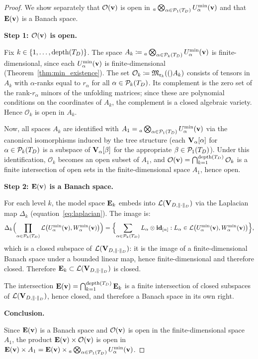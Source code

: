 \begin{proof}
We show separately that $\mathcal{O}(\mathbf{v})$ is open in
${}_a\bigotimes_{\alpha \in \mathcal{P}_{1}(T_D)} U^{\min}_{\alpha}(\mathbf{v})$
and that $\mathbf{E}(\mathbf{v})$ is a Banach space.

\medskip
\noindent\textbf{Step 1: $\mathcal{O}(\mathbf{v})$ is open.}

Fix $k \in \{1, \ldots, \mathrm{depth}(T_D)\}$. The space
$A_k \coloneqq {}_a\bigotimes_{\alpha \in \mathcal{P}_{k}(T_D)} U^{\min}_{\alpha}(\mathbf{v})$
is finite-dimensional, since each $U^{\min}_{\alpha}(\mathbf{v})$ is
finite-dimensional (Theorem~\ref{thm:min_existence}).
The set $\mathcal{O}_k \coloneqq \mathfrak{M}_{\mathfrak{r}_k}(()A_k)$ consists of
tensors in $A_k$ with $\alpha$-ranks equal to $r_\alpha$ for all
$\alpha \in \mathcal{P}_{k}(T_D)$. Its complement is the zero set of the
rank-$r_\alpha$ minors of the unfolding matrices; since these are
polynomial conditions on the coordinates of $A_k$, the complement is
a closed algebraic variety. Hence $\mathcal{O}_k$ is open in $A_k$.

Now, all spaces $A_k$ are identified with
$A_1 = {}_a\bigotimes_{\alpha \in \mathcal{P}_{1}(T_D)} U^{\min}_{\alpha}(\mathbf{v})$
via the canonical isomorphisms induced by the tree structure (each
$\mathbf{V}_\alpha[\alpha]$ for $\alpha \in \mathcal{P}_{k}(T_D)$ is a subspace of
$\mathbf{V}_\alpha[\beta]$ for the appropriate $\beta \in \mathcal{P}_{1}(T_D)$).
Under this identification, $\mathcal{O}_k$ becomes an open subset of
$A_1$, and $\mathcal{O}(\mathbf{v}) = \bigcap_{k=1}^{\mathrm{depth}(T_D)} \mathcal{O}_k$
is a finite intersection of open sets in the finite-dimensional space
$A_1$, hence open.

\medskip
\noindent\textbf{Step 2: $\mathbf{E}(\mathbf{v})$ is a Banach space.}

For each level $k$, the model space $\mathbf{E}_{k}$ embeds into
$\mathcal{L}(\mathbf{V}_{D,\|\cdot\|_D})$ via the Laplacian map $\Delta_k$
(equation~\eqref{eq:laplacian}). The image is:
\begin{equation*}
    \Delta_k\Bigl(\prod_{\alpha \in \mathcal{P}_{k}(T_D)}
    \mathcal{L}\bigl(U^{\min}_{\alpha}(\mathbf{v}), W^{\min}_{\alpha}(\mathbf{v})\bigr)\Bigr)
    = \Bigl\{\sum_{\alpha \in \mathcal{P}_{k}(T_D)}
      L_\alpha \otimes \mathbf{id}_{[\alpha]} :
      L_\alpha \in \mathcal{L}\bigl(U^{\min}_{\alpha}(\mathbf{v}),
      W^{\min}_{\alpha}(\mathbf{v})\bigr)\Bigr\},
\end{equation*}
which is a closed subspace of $\mathcal{L}(\mathbf{V}_{D,\|\cdot\|_D})$: it is the image of a
finite-dimensional Banach space under a bounded linear map, hence
finite-dimensional and therefore closed. Therefore $\mathbf{E}_{k}
\subset \mathcal{L}(\mathbf{V}_{D,\|\cdot\|_D})$ is closed.

The intersection $\mathbf{E}(\mathbf{v}) = \bigcap_{k=1}^{\mathrm{depth}(T_D)} \mathbf{E}_{k}$
is a finite intersection of closed subspaces of $\mathcal{L}(\mathbf{V}_{D,\|\cdot\|_D})$, hence
closed, and therefore a Banach space in its own right.

\medskip
\noindent\textbf{Conclusion.}

Since $\mathbf{E}(\mathbf{v})$ is a Banach space and $\mathcal{O}(\mathbf{v})$ is
open in the finite-dimensional space $A_1$, the product
$\mathbf{E}(\mathbf{v}) \times \mathcal{O}(\mathbf{v})$ is open in
$\mathbf{E}(\mathbf{v}) \times A_1 =
\mathbf{E}(\mathbf{v}) \times {}_a\bigotimes_{\alpha \in \mathcal{P}_{1}(T_D)}
U^{\min}_{\alpha}(\mathbf{v})$.
\end{proof}

